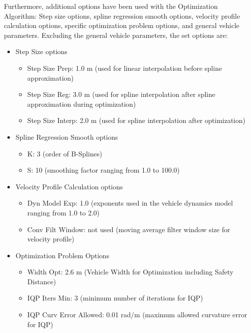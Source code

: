 Furthermore, additional options have been used with the Optimization Algorithm: Step size options, spline regression smooth options, velocity profile calculation options, specific optimization problem options, and general vehicle parameters. Excluding the general vehicle parameters, the set options are:
\begin{itemize}
    \item Step Size options
          \begin{itemize}
              \item Step Size Prep: 1.0 m (used for linear interpolation before spline approximation)
              \item Step Size Reg: 3.0 m (used for spline interpolation after spline approximation during optimization)
              \item Step Size Interp: 2.0 m (used for spline interpolation after optimization)
          \end{itemize}
    \item Spline Regression Smooth options
          \begin{itemize}
              \item K: 3 (order of B-Splines)
              \item S: 10 (smoothing factor ranging from 1.0 to 100.0)
          \end{itemize}
    \item Velocity Profile Calculation options
          \begin{itemize}
              \item Dyn Model Exp: 1.0 (exponents used in the vehicle dynamics model ranging from 1.0 to 2.0)
              \item Conv Filt Window: not used (moving average filter window size for velocity profile)
          \end{itemize}
    \item Optimization Problem Options
          \begin{itemize}
              \item Width Opt: 2.6 m (Vehicle Width for Optimization including Safety Distance)
              \item IQP Iters Min: 3 (minimum number of iterations for IQP)
              \item IQP Curv Error Allowed: 0.01 rad/m (maximum allowed curvature error for IQP)
          \end{itemize}
\end{itemize}

